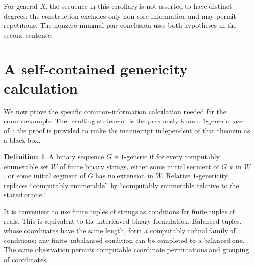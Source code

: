 \documentclass[11pt,a4paper]{article}
\theoremstyle{definition}\newtheorem{definition}[theorem]{Definition}
\theoremstyle{remark}\newtheorem{remark}[theorem]{Remark}
\begin{document}
For general $X$, the sequence in this corollary is not asserted to have distinct degrees: the construction excludes only non-core information and may permit repetitions. The nonzero minimal-pair conclusion uses both hypotheses in the second sentence.

\section{A self-contained genericity calculation}
\label{sec:generic}
We now prove the specific common-information calculation needed for the counterexample. The resulting statement is the previously known $1$-generic case of~\cite[Theorem~4.2]{HJKS}; the proof is provided to make the manuscript independent of that theorem as a black box.

\begin{definition}
A binary sequence $G$ is $1$-generic if for every computably enumerable set $W$ of finite binary strings, either some initial segment of $G$ is in $W$, or some initial segment of $G$ has no extension in $W$. Relative $1$-genericity replaces ``computably enumerable'' by ``computably enumerable relative to the stated oracle.''
\end{definition}

It is convenient to use finite tuples of strings as conditions for finite tuples of reals. This is equivalent to the interleaved binary formulation. Balanced tuples, whose coordinates have the same length, form a computably cofinal family of conditions; any finite unbalanced condition can be completed to a balanced one. The same observation permits computable coordinate permutations and grouping of coordinates.
\end{document}
